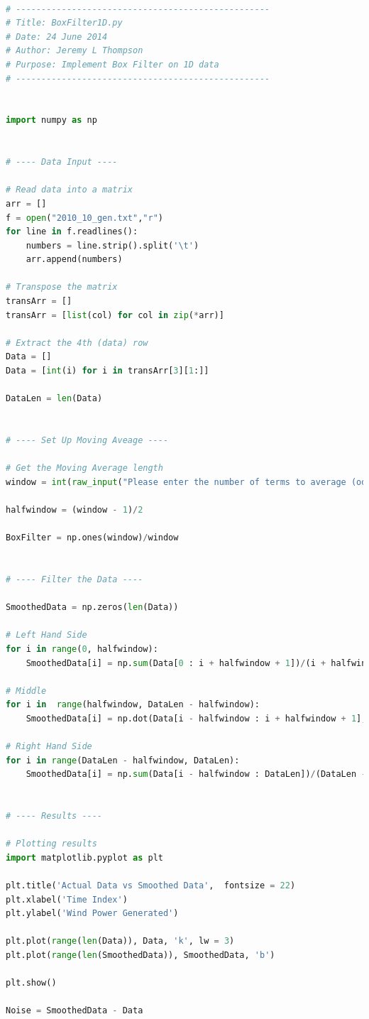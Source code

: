 \documentclass[11pt]{article}
\theoremstyle{definition}
\begin{document}
\begin{lstlisting}[language = Python]

# --------------------------------------------------
# Title: BoxFilter1D.py
# Date: 24 June 2014
# Author: Jeremy L Thompson
# Purpose: Implement Box Filter on 1D data
# --------------------------------------------------


import numpy as np


# ---- Data Input ----

# Read data into a matrix
arr = []
f = open("2010_10_gen.txt","r")
for line in f.readlines():
    numbers = line.strip().split('\t')
    arr.append(numbers)

# Transpose the matrix
transArr = []
transArr = [list(col) for col in zip(*arr)]

# Extract the 4th (data) row
Data = []
Data = [int(i) for i in transArr[3][1:]]

DataLen = len(Data)


# ---- Set Up Moving Aveage ----

# Get the Moving Average length
window = int(raw_input("Please enter the number of terms to average (odd number): "))

halfwindow = (window - 1)/2

BoxFilter = np.ones(window)/window


# ---- Filter the Data ----

SmoothedData = np.zeros(len(Data))

# Left Hand Side
for i in range(0, halfwindow):
    SmoothedData[i] = np.sum(Data[0 : i + halfwindow + 1])/(i + halfwindow + 1)

# Middle
for i in  range(halfwindow, DataLen - halfwindow):
    SmoothedData[i] = np.dot(Data[i - halfwindow : i + halfwindow + 1], BoxFilter)

# Right Hand Side
for i in range(DataLen - halfwindow, DataLen):
    SmoothedData[i] = np.sum(Data[i - halfwindow : DataLen])/(DataLen - i + halfwindow)


# ---- Results ----

# Plotting results
import matplotlib.pyplot as plt

plt.title('Actual Data vs Smoothed Data',  fontsize = 22)
plt.xlabel('Time Index')
plt.ylabel('Wind Power Generated')

plt.plot(range(len(Data)), Data, 'k', lw = 3)
plt.plot(range(len(SmoothedData)), SmoothedData, 'b')

plt.show()

Noise = SmoothedData - Data


\end{lstlisting}
\end{document}
